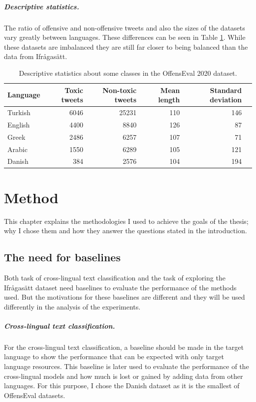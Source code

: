 \documentclass[nofilelist]{cslthse-msc}
\begin{document}
\paragraph{Descriptive statistics.}
The ratio of offensive and non-offensive tweets and also the sizes of the datasets vary greatly between languages. These differences can be seen in Table \ref{tab:deskriptivOffensEval}. While these datasets are imbalanced they are still far closer to being balanced than the data from Ifrågasätt.

\begin{table}[h]
\centering
\begin{tabular}{@{}lrrrrr@{}}
\toprule
Language    & Toxic tweets & Non-toxic tweets & Mean length & Standard deviation \\ \midrule
Turkish      & 6046 & 25231  & 110                & 146    \\
English & 4400 & 8840  & 126                & 87   \\
Greek   & 2486 & 6257 & 107 & 71  \\
Arabic       & 1550 & 6289  & 105                & 121     \\ 
Danish & 384 & 2576 & 104 & 194 \\\bottomrule
\end{tabular}
\caption{Descriptive statistics about some classes in the OffensEval 2020 dataset.}
\label{tab:deskriptivOffensEval}
\end{table}

\chapter{Method}

This chapter explains the methodologies I used to achieve the goals of the thesis; why I chose them and how they answer the questions stated in the introduction.

\section{The need for baselines}

Both task of cross-lingual text classification and the task of exploring the Ifrågasätt dataset need baselines to evaluate the performance of the methods used. But the motivations for these baselines are different and they will be used differently in the analysis of the experiments.

\paragraph{Cross-lingual text classification.}
For the cross-lingual text classification, a baseline should be made in the target language to show the performance that can be expected with only target language resources. This baseline is later used to evaluate the performance of the cross-lingual models and how much is lost or gained by adding data from other languages. For this purpose, I chose the Danish dataset as it is the smallest of OffensEval datasets.
\end{document}
